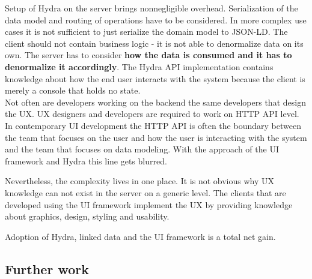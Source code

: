 Setup of Hydra on the server brings nonnegligible overhead. Serialization of the data model and routing of operations have to be considered. In more complex use cases it is not sufficient to just serialize the domain model to JSON-LD. The client should not contain business logic - it is not able to denormalize data on its own. The server has to consider \textbf{how the data is consumed and it has to denormalize it accordingly}. The Hydra API implementation contains knowledge about how the end user interacts with the system because the client is merely a console that holds no state. \\
Not often are developers working on the backend the same developers that design the UX. UX designers and developers are required to work on HTTP API level. In contemporary UI development the HTTP API is often the boundary between the team that focuses on the user and how the user is interacting with the system and the team that focuses on data modeling. With the approach of the UI framework and Hydra this line gets blurred.

Nevertheless, the complexity lives in one place. It is not obvious why UX knowledge can not exist in the server on a generic level. The clients that are developed using the UI framework implement the UX by providing knowledge about graphics, design, styling and usability.

Adoption of Hydra, linked data and the UI framework is a total net gain.

\subsection{Further work}
